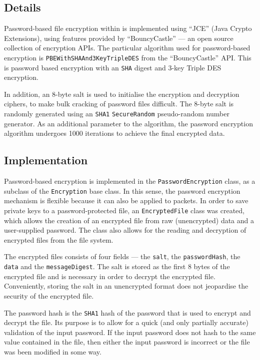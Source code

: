 \documentclass[a4paper,11pt]{article}
\begin{document}
\subsection{Details}
Password-based file encryption within \packageName{} is implemented using 
``JCE'' (Java Crypto Extensions), using features provided by ``BouncyCastle''
--- an open source collection of encryption APIs. The particular algorithm used 
for password-based encryption is \verb+PBEWithSHAAnd3KeyTripleDES+ from the 
``BouncyCastle'' API. This is password based encryption with an \verb+SHA+ 
digest and 3-key Triple DES encryption.

In addition, an 8-byte salt is used to initialise the encryption and decryption 
ciphers, to make bulk cracking of password files difficult. The 8-byte salt is 
randomly generated using an \verb+SHA1+ \verb+SecureRandom+ pseudo-random 
number generator. As an additional parameter to the algorithm, the password 
encryption algorithm undergoes 1000 iterations to achieve the final encrypted 
data.

\subsection{Implementation}
Password-based encryption is implemented in the \verb+PasswordEncryption+ class,
as a subclass of the \verb+Encryption+ base class. In this sense, the password
encryption mechanism is flexible because it can also be applied to 
\serviceName{} packets. In order to save private keys to a password-protected
file, an \verb+EncryptedFile+ class was created, which allows the creation of 
an encrypted file from raw (unencrypted) data and a user-supplied password. The 
class also allows for the reading and decryption of encrypted files from the 
file system.

The encrypted files consists of four fields --- the \verb+salt+, the 
\verb+passwordHash+, the \verb+data+ and the \verb+messageDigest+. The salt is 
stored as the first 8 bytes of the encrypted file and is necessary in order to
decrypt the encrypted file. Conveniently, storing the salt in an unencrypted 
format does not jeopardise the security of the encrypted file.

The password hash is the \verb+SHA1+ hash of the password that is used to 
encrypt and decrypt the file. Its purpose is to allow for a quick (and only 
partially accurate) validation of the input password. If the input password does
not hash to the same value contained in the file, then either the input password
is incorrect or the file was been modified in some way.
\end{document}
